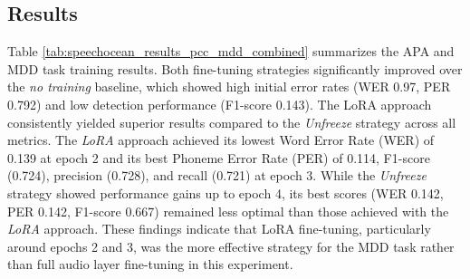 \documentclass[sigconf,nonacm]{acmart}
\begin{document}
\subsection{Results}
Table \ref{tab:speechocean_results_pcc_mdd_combined} summarizes the APA and MDD task training results. Both fine-tuning strategies significantly improved over the \textit{no training} baseline, which showed high initial error rates (WER 0.97, PER 0.792) and low detection performance (F1-score 0.143). The LoRA approach consistently yielded superior results compared to the \textit{Unfreeze} strategy across all metrics. The \textit{LoRA} approach achieved its lowest Word Error Rate (WER) of 0.139 at epoch 2 and its best Phoneme Error Rate (PER) of 0.114, F1-score (0.724), precision (0.728), and recall (0.721) at epoch 3. While the \textit{Unfreeze} strategy showed performance gains up to epoch 4, its best scores (WER 0.142, PER 0.142, F1-score 0.667) remained less optimal than those achieved with the \textit{LoRA} approach. These findings indicate that LoRA fine-tuning, particularly around epochs 2 and 3, was the more effective strategy for the MDD task rather than full audio layer fine-tuning in this experiment.
\end{document}
